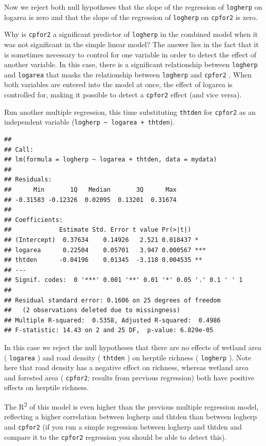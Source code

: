 \documentclass[
  12pt,
]{book}
\makeatletter
\newenvironment{kframe}{%
\medskip{}
\setlength{\fboxsep}{.8em}
\def\at@end@of@kframe{}%
\ifinner\ifhmode%
 \def\at@end@of@kframe{\end{minipage}}%
 \begin{minipage}{\columnwidth}%
\fi\fi%
\def\FrameCommand##1{\hskip\@totalleftmargin \hskip-\fboxsep
\colorbox{incolor}{##1}\hskip-\fboxsep
    \hskip-\linewidth \hskip-\@totalleftmargin \hskip\columnwidth}%
\MakeFramed {\advance\hsize-\width
  \@totalleftmargin\z@ \linewidth\hsize
  \@setminipage}}%
{\par\unskip\endMakeFramed%
\at@end@of@kframe}
\newenvironment{rmdblock}[1]
 {
 \begin{itemize}
 \renewcommand{\labelitemi}{
   \raisebox{-.7\height}[0pt][0pt]{
     {\setkeys{Gin}{width=3em,keepaspectratio}\texttt{[image: images/\#1]}}
   }
 }
 \begin{kframe}
 \setlength{\fboxsep}{1em}
 \item
 }
 {
 \end{kframe}
 \end{itemize}
 }
\newenvironment{rmdcode}
  {\begin{rmdblock}{screen}}
  {\end{rmdblock}}
\makeatother
\begin{document}
Now we reject both null hypotheses that the slope of the regression of \texttt{logherp} on logarea is zero and that the slope of the regression of \texttt{logherp} on \texttt{cpfor2} is zero.

Why is \texttt{cpfor2} a significant predictor of \texttt{logherp} in the combined model when it was not significant in the simple linear model? The answer lies in the fact that it is sometimes necessary to control for one variable in order to detect the effect of another variable. In this case, there is a significant relationship between \texttt{logherp} and \texttt{logarea} that masks the relationship between \texttt{logherp} and \texttt{cpfor2} . When both variables are entered into the model at once, the effect of logarea is controlled for, making it possible to detect a \texttt{cpfor2} effect (and vice versa).

\begin{rmdcode}
Run another multiple regression, this time substituting \texttt{thtden} for \texttt{cpfor2} as an independent variable (\texttt{logherp\ \textasciitilde{}\ logarea\ +\ thtden}).
\end{rmdcode}

\begin{verbatim}
## 
## Call:
## lm(formula = logherp ~ logarea + thtden, data = mydata)
## 
## Residuals:
##      Min       1Q   Median       3Q      Max 
## -0.31583 -0.12326  0.02095  0.13201  0.31674 
## 
## Coefficients:
##             Estimate Std. Error t value Pr(>|t|)    
## (Intercept)  0.37634    0.14926   2.521 0.018437 *  
## logarea      0.22504    0.05701   3.947 0.000567 ***
## thtden      -0.04196    0.01345  -3.118 0.004535 ** 
## ---
## Signif. codes:  0 '***' 0.001 '**' 0.01 '*' 0.05 '.' 0.1 ' ' 1
## 
## Residual standard error: 0.1606 on 25 degrees of freedom
##   (2 observations deleted due to missingness)
## Multiple R-squared:  0.5358, Adjusted R-squared:  0.4986 
## F-statistic: 14.43 on 2 and 25 DF,  p-value: 6.829e-05
\end{verbatim}

In this case we reject the null hypotheses that there are no effects of wetland area ( \texttt{logarea} ) and road density ( \texttt{thtden} ) on herptile richness ( \texttt{logherp} ). Note here that road density has a negative effect on richness, whereas wetland area and forested area ( \texttt{cpfor2}; results from previous regression) both have positive effects on herptile richness.

The R\textsuperscript{2} of this model is even higher than the previous multiple regression model, reflecting a higher correlation between logherp and thtden than between logherp and \texttt{cpfor2} (if you run a simple regression between logherp and thtden and compare it to the \texttt{cpfor2} regression you should be able to detect this).
\end{document}
